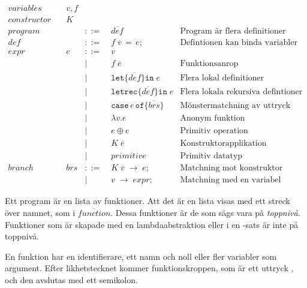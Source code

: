 \documentclass[Rapport]{subfiles}
\begin{document}
\begin{equation*}
\begin{aligned}
variables \quad & v,f \\
constructor \quad & K \\
program \quad&&::=&\; \overline{def} 
        & \text{Program är flera definitioner}\\ 
def  \quad && ::=&\; f \; \overline{v} \, \mathtt{=} \, e \mathtt{;} 
        & \text {Defintionen kan binda variabler för ett uttryck}\\
expr \quad & e &::=&\;  v \\
       &&|&\; f \; \overline{e}  
            & \text{Funktionsanrop} \\ 
       &&|&\; \mathtt{let \{} \overline{def} \mathtt{\} in }\; e 
            & \text{Flera lokal definitioner}\\
       &&|&\; \mathtt{letrec \{} \overline{def} \mathtt{\} in} \; e 
            & \text{Flera lokala rekursiva defintioner} \\
       &&|&\; \mathtt{case} \, e \, \mathtt{of \{} \overline{brs} \mathtt{\}} 
            & \text{Mönstermatchning av uttryck} \\
       &&|&\; \mathtt{\lambda } v \mathtt{.} e
            & \text{Anonym funktion} \\
       &&|&\; e \oplus e 
            & \text{Primitiv operation}\\ 
       &&|&\; K \; \overline{e} 
            & \text{Konstruktorapplikation} \\
       &&|&\; primitive 
            & \text{Primitiv datatyp} \\
branch \quad & brs &::=&\; K \; \overline{v} \; \mathtt{\rightarrow} \; e \mathtt{;} 
            & \text{Matchning mot konstruktor} \\
         &&|&\; v \; \mathtt{\rightarrow} \; expr \mathtt{;}
            & \text{Matchning med en variabel}
\end{aligned}
\end{equation*}


Ett program är en lista av funktioner. Att det är en lista visas med ett streck över namnet, som i $\overline{function}$.
Dessa funktioner är de som sägs vara på \emph{toppnivå}. Funktioner som är 
skapade med en lambdaabstraktion eller i en -sats är inte på toppnivå. 

En funktion har en identifierare, ett namn och noll eller fler variabler som argument. Efter likhetstecknet
kommer funktionskroppen, som är ett uttryck , och den avslutas med
ett semikolon.
\end{document}
